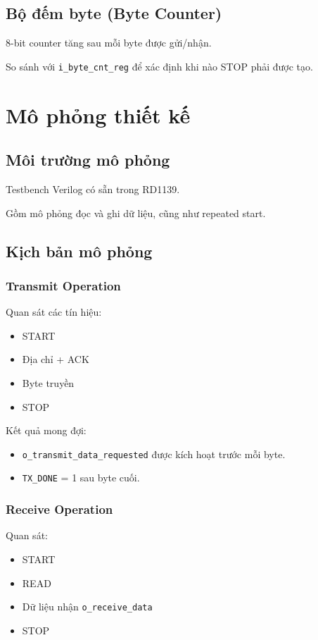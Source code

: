 \subsection{Bộ đếm byte (Byte Counter)}
8-bit counter tăng sau mỗi byte được gửi/nhận.

So sánh với \texttt{i\_byte\_cnt\_reg} để xác định khi nào STOP phải được tạo.

\section{Mô phỏng thiết kế}

\subsection{Môi trường mô phỏng}
Testbench Verilog có sẵn trong RD1139.

Gồm mô phỏng đọc và ghi dữ liệu, cũng như repeated start.

\subsection{Kịch bản mô phỏng}

\subsubsection{Transmit Operation}
Quan sát các tín hiệu:
\begin{itemize}[leftmargin=1.2cm]
    \item START
    \item Địa chỉ + ACK
    \item Byte truyền
    \item STOP
\end{itemize}

Kết quả mong đợi:
\begin{itemize}[leftmargin=1.2cm]
    \item \texttt{o\_transmit\_data\_requested} được kích hoạt trước mỗi byte.
    \item \texttt{TX\_DONE} = 1 sau byte cuối.
\end{itemize}

\subsubsection{Receive Operation}
Quan sát:
\begin{itemize}[leftmargin=1.2cm]
    \item START
    \item READ
    \item Dữ liệu nhận \texttt{o\_receive\_data}
    \item STOP
\end{itemize}

